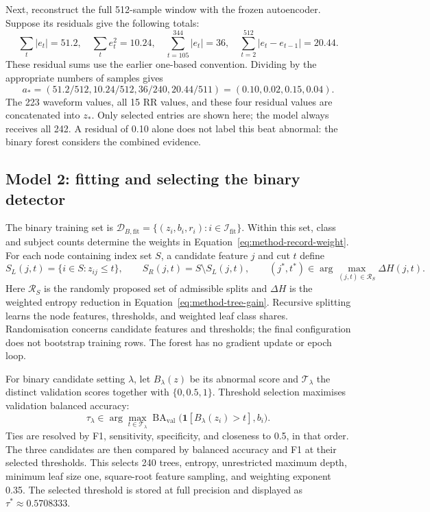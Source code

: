 Next, reconstruct the full 512-sample window with the frozen autoencoder.
Suppose its residuals give the following totals:
\begin{equation}
 \sum_t|e_t|=51.2,\quad \sum_te_t^2=10.24,\quad
 \sum_{t=105}^{344}|e_t|=36,\quad
 \sum_{t=2}^{512}|e_t-e_{t-1}|=20.44.
 \label{eq:method-example-residual-totals}
\end{equation}
These residual sums use the earlier one-based convention. Dividing by the
appropriate numbers of samples gives
\begin{equation}
 a_*=(51.2/512,10.24/512,36/240,20.44/511)
     =(0.10,0.02,0.15,0.04).
 \label{eq:method-example-residual-features}
\end{equation}
The 223 waveform values, all 15 RR values, and these four residual values
are concatenated into $z_*$. Only selected entries are shown here; the
model always receives all 242. A residual of 0.10 alone does not label
this beat abnormal: the binary forest considers the combined evidence.

\subsection{Model 2: fitting and selecting the binary detector}

The binary training set is
$\mathcal{D}_{B,\mathrm{fit}}=\{(z_i,b_i,r_i):i\in\mathcal{I}_{\mathrm{fit}}\}$.
Within this set, class and subject counts determine the weights in
Equation~\ref{eq:method-record-weight}. For each node containing index set
$S$, a candidate feature $j$ and cut $t$ define
\begin{equation}
 S_L(j,t)=\{i\in S:z_{ij}\leq t\},\qquad
 S_R(j,t)=S\setminus S_L(j,t),\qquad
 (j^*,t^*)\in\arg\max_{(j,t)\in\mathcal{R}_S}\Delta H(j,t).
 \label{eq:method-randomised-node-fit}
\end{equation}
Here $\mathcal{R}_S$ is the randomly proposed set of admissible splits and
$\Delta H$ is the weighted entropy reduction in
Equation~\ref{eq:method-tree-gain}. Recursive splitting learns the node
features, thresholds, and weighted leaf class shares. Randomisation concerns
candidate features and thresholds; the final configuration does not bootstrap
training rows. The forest has no gradient update or epoch loop.

For binary candidate setting $\lambda$, let $B_\lambda(z)$ be its abnormal
score and $\mathcal{T}_\lambda$ the distinct validation scores together with
$\{0,0.5,1\}$. Threshold selection maximises validation balanced accuracy:
\begin{equation}
 \tau_\lambda\in\arg\max_{t\in\mathcal{T}_\lambda}
 \operatorname{BA}_{\mathrm{val}}
 \bigl(\mathbf{1}[B_\lambda(z_i)>t],b_i\bigr).
 \label{eq:method-validation-threshold-selection}
\end{equation}
Ties are resolved by F1, sensitivity, specificity, and closeness to 0.5,
in that order. The three candidates are then compared by balanced accuracy
and F1 at their selected thresholds. This selects 240 trees, entropy,
unrestricted maximum depth, minimum leaf size one, square-root feature
sampling, and weighting exponent 0.35. The selected threshold is stored
at full precision and displayed as $\tau^*\approx0.5708333$.

